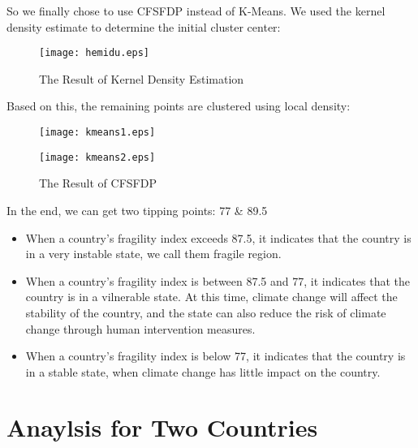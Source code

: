 \documentclass{mcmthesis}
\begin{document}
				
				So we finally chose to use CFSFDP instead of K-Means. We used the kernel density estimate to determine the initial cluster center:
				
				\begin{figure}[h]
					\small
					\centering
					\texttt{[image: hemidu.eps]}
					\caption{The Result of Kernel Density Estimation}
					\label{fig:hemidu}
				\end{figure}
				
				\clearpage
				
				Based on this, the remaining points are clustered using local density:
				
				\begin{figure}[h]
					\small
					\centering
					\texttt{[image: kmeans1.eps]}
					\label{fig:kmeans1}
				\end{figure}
			
				\begin{figure}[h]
					\small
					\centering
					\texttt{[image: kmeans2.eps]}
					\caption{The Result of CFSFDP}
					\label{fig:kmeans2}
				\end{figure}
				
				
				
				In the end, we can get two tipping points: 77 \& 89.5
				
				\begin{itemize}
					
					\item When a country’s fragility index exceeds 87.5, it indicates that the country is in a very instable state, we call them fragile region.
					
					\item When a country's fragility index is between 87.5 and 77, it indicates that the country is in a vilnerable state. At this time, climate change will affect the stability of the country, and the state can also reduce the risk of climate change through human intervention measures.
					
					\item When a country's fragility index is below 77, it indicates that the country is in a stable state, when climate change has little impact on the country.
					
				\end{itemize}
				
	
	\section{Anaylsis for Two Countries}
\end{document}
